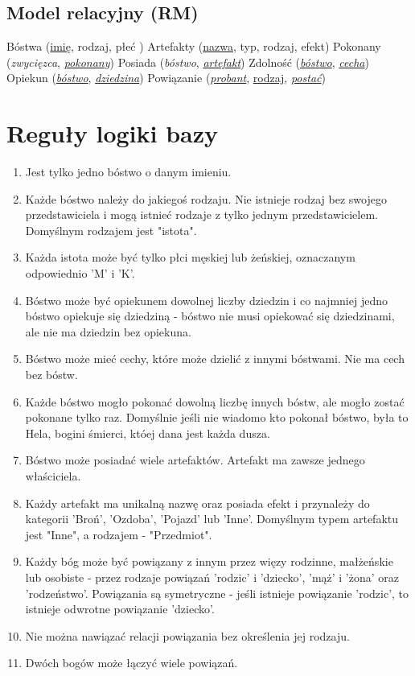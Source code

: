 \documentclass[11pt]{article}
\begin{document}
\subsection{Model relacyjny (RM)}

Bóstwa (\underline{imię}, rodzaj, płeć ) \newline
Artefakty (\underline{nazwa}, typ, rodzaj, efekt) \newline
Pokonany (\textit{zwycięzca}, \underline{\textit{pokonany}}) \newline
Posiada (\textit{bóstwo}, \underline{\textit{artefakt}}) \newline
Zdolność (\underline{\textit{bóstwo}}, \underline{\textit{cecha}}) \newline
Opiekun (\underline{\textit{bóstwo}}, \underline{\textit{dziedzina}}) \newline
Powiązanie (\underline{\textit{probant}}, \underline{rodzaj}, \underline{\textit{postać}}) \newline

\newpage

\section{Reguły logiki bazy}
\begin{enumerate}
	\item Jest tylko jedno bóstwo o danym imieniu.
	\item Każde bóstwo należy do jakiegoś rodzaju. Nie istnieje rodzaj bez swojego przedstawiciela i mogą istnieć rodzaje z tylko jednym przedstawicielem. Domyślnym rodzajem jest "istota".
	\item Każda istota może być tylko płci męskiej lub żeńskiej, oznaczanym odpowiednio 'M' i 'K'.
	\item Bóstwo może być opiekunem dowolnej liczby dziedzin i co najmniej jedno bóstwo opiekuje się dziedziną - bóstwo nie musi opiekować się dziedzinami, ale nie ma dziedzin bez opiekuna.
	\item Bóstwo może mieć cechy, które może dzielić z innymi bóstwami. Nie ma cech bez bóstw.
	\item Każde bóstwo mogło pokonać dowolną liczbę innych bóstw, ale mogło zostać pokonane tylko raz. Domyślnie jeśli nie wiadomo kto pokonał bóstwo, była to Hela, bogini śmierci, któej dana jest każda dusza.
	\item Bóstwo może posiadać wiele artefaktów. Artefakt ma zawsze jednego właściciela.
	\item Każdy artefakt ma unikalną nazwę oraz posiada efekt i przynależy do kategorii 'Broń', 'Ozdoba', 'Pojazd' lub 'Inne'. Domyślnym typem artefaktu jest "Inne", a rodzajem - "Przedmiot".
	\item Każdy bóg może być powiązany z innym przez więzy rodzinne, małżeńskie lub osobiste - przez rodzaje powiązań 'rodzic' i 'dziecko', 'mąż' i 'żona' oraz 'rodzeństwo'. Powiązania są symetryczne - jeśli istnieje powiązanie 'rodzic', to istnieje odwrotne powiązanie 'dziecko'. 
	\item Nie można nawiązać relacji powiązania bez określenia jej rodzaju.
	\item Dwóch bogów może łączyć wiele powiązań. 
\end{enumerate}
\end{document}
